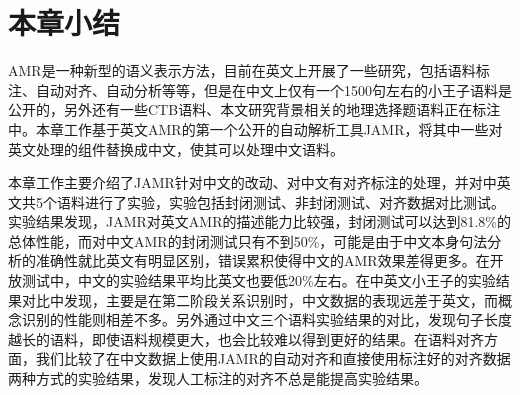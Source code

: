 \documentclass[master, winfont]{njuthesis}
\begin{document}
\begin{center}
\begin{table}[!htbp]
\caption{\label{align_exp} 中文AMR人工对齐数据的影响}
\end{table}
\end{center}

\section{本章小结}
AMR是一种新型的语义表示方法，目前在英文上开展了一些研究，包括语料标注、自动对齐、自动分析等等，但是在中文上仅有一个1500句左右的小王子语料是公开的，另外还有一些CTB语料、本文研究背景相关的地理选择题语料正在标注中。本章工作基于英文AMR的第一个公开的自动解析工具JAMR，将其中一些对英文处理的组件替换成中文，使其可以处理中文语料。

本章工作主要介绍了JAMR针对中文的改动、对中文有对齐标注的处理，并对中英文共5个语料进行了实验，实验包括封闭测试、非封闭测试、对齐数据对比测试。实验结果发现，JAMR对英文AMR的描述能力比较强，封闭测试可以达到81.8\%的总体性能，而对中文AMR的封闭测试只有不到50\%，可能是由于中文本身句法分析的准确性就比英文有明显区别，错误累积使得中文的AMR效果差得更多。在开放测试中，中文的实验结果平均比英文也要低20\%左右。在中英文小王子的实验结果对比中发现，主要是在第二阶段关系识别时，中文数据的表现远差于英文，而概念识别的性能则相差不多。另外通过中文三个语料实验结果的对比，发现句子长度越长的语料，即使语料规模更大，也会比较难以得到更好的结果。在语料对齐方面，我们比较了在中文数据上使用JAMR的自动对齐和直接使用标注好的对齐数据两种方式的实验结果，发现人工标注的对齐不总是能提高实验结果。
\end{document}
